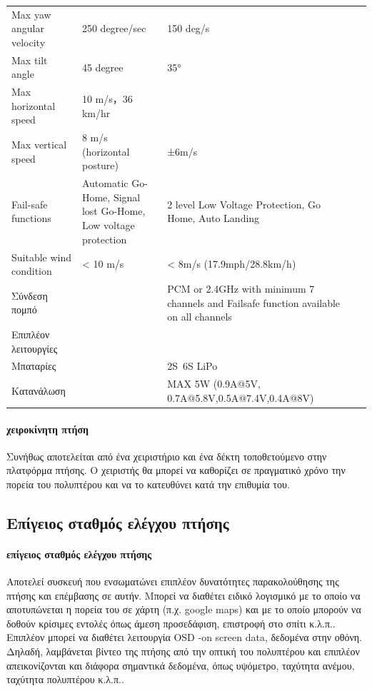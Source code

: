 \documentclass[a4paper, 12pt, twoside]{report}
\begin{document}
{{{{{{\begin{landscape}
\begin{longtable} { m{3cm} m{3.5cm} m{3.5cm} m{3.5cm} m{3.5cm} }
					Max yaw angular velocity & 250 degree/sec & 150 deg/s & & \\
					Max tilt angle & 45 degree & 35° & & \\
					Max horizontal speed & 10 m/s，36 km/hr & & & \\
					Max vertical speed & 8 m/s (horizontal posture) & ±6m/s & & \\
					Fail-safe functions & Automatic Go-Home, Signal lost Go-Home, Low voltage protection & 2 level Low Voltage Protection, Go Home, Auto Landing & & \\
					Suitable wind condition &  < 10 m/s & < 8m/s (17.9mph/28.8km/h) & & \\
					Σύνδεση πομπό & & PCM or 2.4GHz with minimum 7 channels and Failsafe function available on all channels & & \\
					Επιπλέον λειτουργίες & & & & \\
					Μπαταρίες & & 2S~6S LiPo & & \\
					Κατανάλωση & & MAX 5W (0.9A@5V, 0.7A@5.8V,0.5A@7.4V,0.4A@8V) & & \\
					\hline
				\end{longtable}
				\end{landscape}

			\paragraph{χειροκίνητη πτήση}{Συνήθως αποτελείται από ένα χειριστήριο και ένα δέκτη τοποθετούμενο στην πλατφόρμα πτήσης. Ο χειριστής θα μπορεί να καθορίζει σε πραγματικό χρόνο την πορεία του πολυπτέρου και να το κατευθύνει κατά την επιθυμία του.
			}
			
		\subsection{Επίγειος σταθμός ελέγχου πτήσης}	
			\paragraph{επίγειος σταθμός ελέγχου πτήσης}{Αποτελεί συσκευή που ενσωματώνει επιπλέον δυνατότητες παρακολούθησης της πτήσης και επέμβασης σε αυτήν. Μπορεί να διαθέτει ειδικό λογισμικό με το οποίο να αποτυπώνεται η πορεία του σε χάρτη (π.χ. google maps) και με το οποίο μπορούν να δοθούν κρίσιμες εντολές όπως άμεση προσεδάφιση, επιστροφή στο σπίτι κ.λ.π.. Επιπλέον μπορεί να διαθέτει λειτουργία OSD -on screen data, δεδομένα στην οθόνη. Δηλαδή, λαμβάνεται βίντεο της πτήσης από την οπτική του πολυπτέρου και επιπλέον απεικονίζονται και διάφορα σημαντικά δεδομένα, όπως υψόμετρο, ταχύτητα ανέμου, ταχύτητα πολυπτέρου κ.λ.π..
			}
			
}}}}}}
\end{document}
